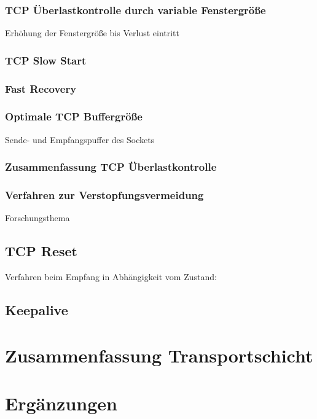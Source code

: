\subsubsection{TCP Überlastkontrolle durch variable Fenstergröße}
Erhöhung der Fenstergröße bis Verlust eintritt
\subsubsection{TCP Slow Start}
\subsubsection{Fast Recovery}
\subsubsection{Optimale TCP Buffergröße}
Sende- und Empfangspuffer des Sockets
\subsubsection{Zusammenfassung TCP Überlastkontrolle}
\subsubsection{Verfahren zur Verstopfungsvermeidung}
Forschungsthema

\subsection{TCP Reset}
Verfahren beim Empfang in Abhängigkeit vom Zustand:

\subsection{Keepalive}

\section{Zusammenfassung Transportschicht}

\section{Ergänzungen}
